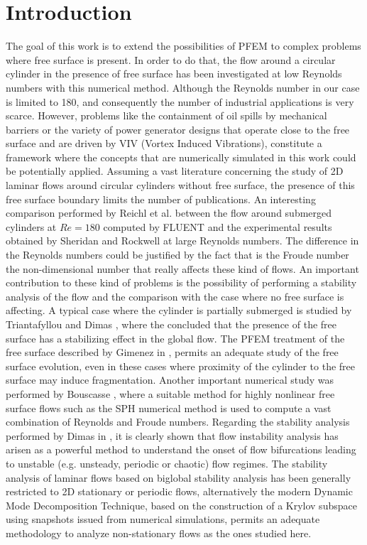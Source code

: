 \documentclass[a4paper,conference]{IEEEtran}
\begin{document}
\section{Introduction}

The goal of this work is to extend the possibilities of PFEM to complex problems where free surface is present. In order to do that, the flow around a circular cylinder in the presence of free surface has been investigated at low Reynolds numbers with this numerical method. Although the Reynolds number in our case is limited to 180, and consequently the number of industrial applications is very scarce. However, problems like the containment of oil spills by mechanical barriers \cite{Amini} or the variety of power generator designs that operate close to the free surface and are driven by VIV (Vortex Induced Vibrations), constitute a framework where the concepts that are numerically simulated in this work could be potentially applied. Assuming a vast literature concerning the study of 2D laminar flows around circular cylinders without free surface, the presence of this free surface boundary limits the number of publications. An interesting comparison performed by Reichl et al. \cite{Reichl} between the flow around submerged cylinders at $Re=180$ computed by FLUENT and the experimental results obtained by Sheridan and Rockwell \cite{Sheridan95,Sheridan97} at large Reynolds numbers. The difference in the Reynolds numbers could be justified by the fact that is the Froude number the non-dimensional number that really affects these kind of flows. An important contribution to these kind of problems is the possibility of performing a stability analysis of the flow and the comparison with the case where no free surface is affecting. A typical case where the cylinder is partially submerged is studied by Triantafyllou and Dimas \cite{TriantafyllouDimas}, where the concluded that the presence of the free surface has a stabilizing effect in the global flow. The PFEM treatment of the free surface described by Gimenez in \cite{GimenezGonzalez}, permits an adequate study of the free surface evolution, even in these cases where proximity of the cylinder to the free surface may induce fragmentation. Another important numerical study was performed by Bouscasse \cite{Bouscasse}, where a suitable method for highly nonlinear free surface flows such as the SPH numerical method \cite{Monaghan} is used to compute a vast combination of Reynolds and Froude numbers.
Regarding the stability analysis performed by Dimas in \cite{Dimas}, it is clearly shown that flow instability analysis has arisen as a powerful method to understand the onset of flow bifurcations leading to unstable (e.g. unsteady, periodic or chaotic) flow regimes. The stability analysis of laminar flows based on biglobal stability analysis has been generally restricted to 2D stationary or periodic flows, alternatively the modern Dynamic Mode Decomposition Technique, based on the construction of a Krylov subspace using snapshots issued from numerical simulations, permits an adequate methodology to analyze non-stationary flows as the ones studied here.
\end{document}
